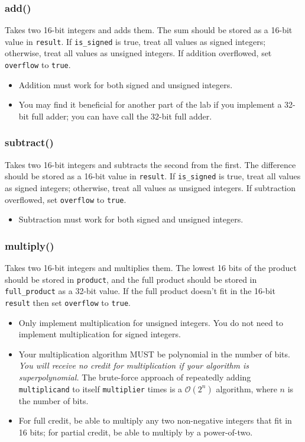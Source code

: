 \subsubsection*{add()} Takes two 16-bit integers and adds them.  The sum should
be stored as a 16-bit value in \lstinline{result}.  If \lstinline{is_signed}
is true, treat all values as signed integers; otherwise, treat all values as
unsigned integers.  If addition overflowed, set \lstinline{overflow} to
\lstinline{true}.
\begin{itemize}
\item Addition must work for both signed and unsigned integers.
\item You may find it beneficial for another part of the lab if you implement a
    32-bit full adder; you can have  call the 32-bit full
    adder.
\end{itemize}

\subsubsection*{subtract()} Takes two 16-bit integers and subtracts the second
from the first.  The difference should be stored as a 16-bit value in
\lstinline{result}.  If \lstinline{is_signed} is true, treat all values as
signed integers; otherwise, treat all values as unsigned integers.  If
subtraction overflowed, set \lstinline{overflow} to \lstinline{true}.
\begin{itemize}
\item Subtraction must work for both signed and unsigned integers.
\end{itemize}

\subsubsection*{multiply()} Takes two 16-bit integers and multiplies them.  The
lowest 16 bits of the product should be stored in \lstinline{product}, and the
full product should be stored in \lstinline{full_product} as a 32-bit value.
If the full product doesn't fit in the 16-bit \lstinline{result} then set
\lstinline{overflow} to \lstinline{true}.
\begin{itemize}
\item Only implement multiplication for unsigned integers.  You do not need to
    implement multiplication for signed integers.
\item Your multiplication algorithm MUST be polynomial in the number of bits.
    \textit{You will receive no credit for multiplication if your algorithm is
    superpolynomial.} The brute-force approach of repeatedly adding
    \lstinline{multiplicand} to itself \lstinline{multiplier} times is a
    $\mathcal{O}(2^n)$ algorithm, where $n$ is the number of bits.
\item For full credit, be able to multiply any two non-negative integers that
    fit in 16 bits; for partial credit, be able to multiply by a power-of-two.
\end{itemize}

